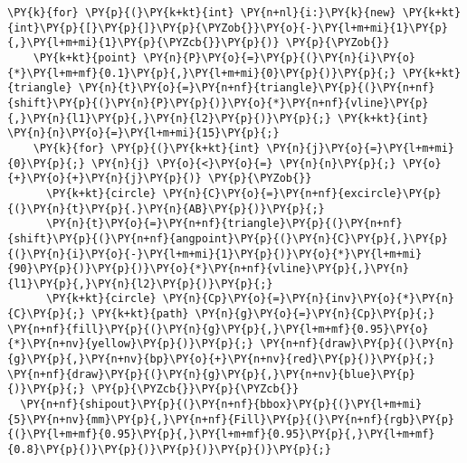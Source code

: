 \begin{Verbatim}[commandchars=\\\{\}]
  \PY{k}{for} \PY{p}{(}\PY{k+kt}{int} \PY{n+nl}{i:}\PY{k}{new} \PY{k+kt}{int}\PY{p}{[}\PY{p}{]}\PY{p}{\PYZob{}}\PY{o}{-}\PY{l+m+mi}{1}\PY{p}{,}\PY{l+m+mi}{1}\PY{p}{\PYZcb{}}\PY{p}{)} \PY{p}{\PYZob{}}
    \PY{k+kt}{point} \PY{n}{P}\PY{o}{=}\PY{p}{(}\PY{n}{i}\PY{o}{*}\PY{l+m+mf}{0.1}\PY{p}{,}\PY{l+m+mi}{0}\PY{p}{)}\PY{p}{;} \PY{k+kt}{triangle} \PY{n}{t}\PY{o}{=}\PY{n+nf}{triangle}\PY{p}{(}\PY{n+nf}{shift}\PY{p}{(}\PY{n}{P}\PY{p}{)}\PY{o}{*}\PY{n+nf}{vline}\PY{p}{,}\PY{n}{l1}\PY{p}{,}\PY{n}{l2}\PY{p}{)}\PY{p}{;} \PY{k+kt}{int} \PY{n}{n}\PY{o}{=}\PY{l+m+mi}{15}\PY{p}{;}
    \PY{k}{for} \PY{p}{(}\PY{k+kt}{int} \PY{n}{j}\PY{o}{=}\PY{l+m+mi}{0}\PY{p}{;} \PY{n}{j} \PY{o}{<}\PY{o}{=} \PY{n}{n}\PY{p}{;} \PY{o}{+}\PY{o}{+}\PY{n}{j}\PY{p}{)} \PY{p}{\PYZob{}}
      \PY{k+kt}{circle} \PY{n}{C}\PY{o}{=}\PY{n+nf}{excircle}\PY{p}{(}\PY{n}{t}\PY{p}{.}\PY{n}{AB}\PY{p}{)}\PY{p}{;}
      \PY{n}{t}\PY{o}{=}\PY{n+nf}{triangle}\PY{p}{(}\PY{n+nf}{shift}\PY{p}{(}\PY{n+nf}{angpoint}\PY{p}{(}\PY{n}{C}\PY{p}{,}\PY{p}{(}\PY{n}{i}\PY{o}{-}\PY{l+m+mi}{1}\PY{p}{)}\PY{o}{*}\PY{l+m+mi}{90}\PY{p}{)}\PY{p}{)}\PY{o}{*}\PY{n+nf}{vline}\PY{p}{,}\PY{n}{l1}\PY{p}{,}\PY{n}{l2}\PY{p}{)}\PY{p}{;}
      \PY{k+kt}{circle} \PY{n}{Cp}\PY{o}{=}\PY{n}{inv}\PY{o}{*}\PY{n}{C}\PY{p}{;} \PY{k+kt}{path} \PY{n}{g}\PY{o}{=}\PY{n}{Cp}\PY{p}{;} \PY{n+nf}{fill}\PY{p}{(}\PY{n}{g}\PY{p}{,}\PY{l+m+mf}{0.95}\PY{o}{*}\PY{n+nv}{yellow}\PY{p}{)}\PY{p}{;} \PY{n+nf}{draw}\PY{p}{(}\PY{n}{g}\PY{p}{,}\PY{n+nv}{bp}\PY{o}{+}\PY{n+nv}{red}\PY{p}{)}\PY{p}{;} \PY{n+nf}{draw}\PY{p}{(}\PY{n}{g}\PY{p}{,}\PY{n+nv}{blue}\PY{p}{)}\PY{p}{;} \PY{p}{\PYZcb{}}\PY{p}{\PYZcb{}}
  \PY{n+nf}{shipout}\PY{p}{(}\PY{n+nf}{bbox}\PY{p}{(}\PY{l+m+mi}{5}\PY{n+nv}{mm}\PY{p}{,}\PY{n+nf}{Fill}\PY{p}{(}\PY{n+nf}{rgb}\PY{p}{(}\PY{l+m+mf}{0.95}\PY{p}{,}\PY{l+m+mf}{0.95}\PY{p}{,}\PY{l+m+mf}{0.8}\PY{p}{)}\PY{p}{)}\PY{p}{)}\PY{p}{)}\PY{p}{;}
\end{Verbatim}
